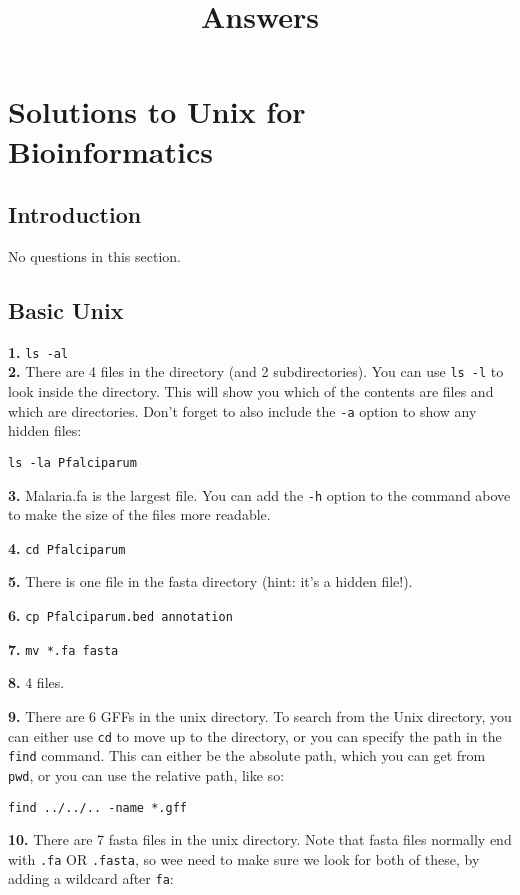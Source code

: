\documentclass[11pt]{article}
\title{Answers}
\begin{document}
    \hypertarget{solutions-to-unix-for-bioinformatics}{%
\section{Solutions to Unix for
Bioinformatics}\label{solutions-to-unix-for-bioinformatics}}

\hypertarget{introduction}{%
\subsection{Introduction}\label{introduction}}

No questions in this section.

\hypertarget{basic-unix}{%
\subsection{Basic Unix}\label{basic-unix}}

\textbf{1.} \texttt{ls\ -al}\\
\textbf{2.} There are 4 files in the directory (and 2 subdirectories).
You can use \texttt{ls\ -l} to look inside the directory. This will show
you which of the contents are files and which are directories. Don't
forget to also include the \texttt{-a} option to show any hidden files:

\texttt{ls\ -la\ Pfalciparum}

\textbf{3.} Malaria.fa is the largest file. You can add the \texttt{-h}
option to the command above to make the size of the files more readable.

\textbf{4.} \texttt{cd\ Pfalciparum}

\textbf{5.} There is one file in the fasta directory (hint: it's a
hidden file!).

\textbf{6.} \texttt{cp\ Pfalciparum.bed\ annotation}

\textbf{7.} \texttt{mv\ *.fa\ fasta}

\textbf{8.} 4 files.

\textbf{9.} There are 6 GFFs in the unix directory. To search from the
Unix directory, you can either use \texttt{cd} to move up to the
directory, or you can specify the path in the \texttt{find} command.
This can either be the absolute path, which you can get from
\texttt{pwd}, or you can use the relative path, like so:

\texttt{find\ ../../..\ -name\ *.gff}

\textbf{10.} There are 7 fasta files in the unix directory. Note that
fasta files normally end with \texttt{.fa} OR \texttt{.fasta}, so wee
need to make sure we look for both of these, by adding a wildcard after
\texttt{fa}:
\end{document}
